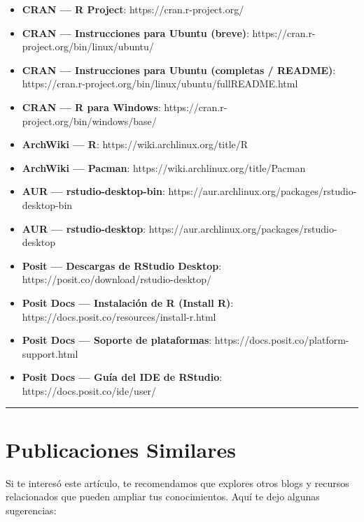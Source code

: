 \documentclass[
  man,
  floatsintext,
  longtable,
  a4paper,
  nolmodern,
  notxfonts,
  notimes,
  12pt,
  colorlinks=true,linkcolor=blue,citecolor=blue,urlcolor=blue]{apa7}
\providecommand{\tightlist}{%
  \setlength{\itemsep}{0pt}\setlength{\parskip}{0pt}}
\begin{document}
\begin{itemize}
\tightlist
\item
  \textbf{CRAN --- R Project}: https://cran.r-project.org/
\item
  \textbf{CRAN --- Instrucciones para Ubuntu (breve)}:
  https://cran.r-project.org/bin/linux/ubuntu/
\item
  \textbf{CRAN --- Instrucciones para Ubuntu (completas / README)}:
  https://cran.r-project.org/bin/linux/ubuntu/fullREADME.html
\item
  \textbf{CRAN --- R para Windows}:
  https://cran.r-project.org/bin/windows/base/
\item
  \textbf{ArchWiki --- R}: https://wiki.archlinux.org/title/R
\item
  \textbf{ArchWiki --- Pacman}: https://wiki.archlinux.org/title/Pacman
\item
  \textbf{AUR --- rstudio-desktop-bin}:
  https://aur.archlinux.org/packages/rstudio-desktop-bin
\item
  \textbf{AUR --- rstudio-desktop}:
  https://aur.archlinux.org/packages/rstudio-desktop
\item
  \textbf{Posit --- Descargas de RStudio Desktop}:
  https://posit.co/download/rstudio-desktop/
\item
  \textbf{Posit Docs --- Instalación de R (Install R)}:
  https://docs.posit.co/resources/install-r.html
\item
  \textbf{Posit Docs --- Soporte de plataformas}:
  https://docs.posit.co/platform-support.html
\item
  \textbf{Posit Docs --- Guía del IDE de RStudio}:
  https://docs.posit.co/ide/user/
\end{itemize}

\begin{center}\rule{0.5\linewidth}{0.5pt}\end{center}

\appendix

\section{Publicaciones Similares}\label{apx-publicaciones-similares}

Si te interesó este artículo, te recomendamos que explores otros blogs y
recursos relacionados que pueden ampliar tus conocimientos. Aquí te dejo
algunas sugerencias:
\end{document}
